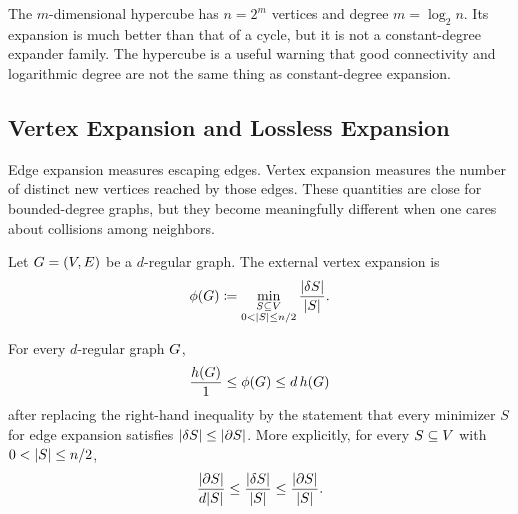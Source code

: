 \begin{example}[Hypercube]
	\label{ex:hypercube}
	The \(m\)-dimensional hypercube has \(n=2^m\) vertices and degree \(m=\log_2 n\). Its expansion is much better than that of a cycle, but it is not a constant-degree expander family. The hypercube is a useful warning that good connectivity and logarithmic degree are not the same thing as constant-degree expansion.
\end{example}

\subsection{Vertex Expansion and Lossless Expansion}
\label{subsec:vertex-expansion}

Edge expansion measures escaping edges. Vertex expansion measures the number of distinct new vertices reached by those edges. These quantities are close for bounded-degree graphs, but they become meaningfully different when one cares about collisions among neighbors.

\begin{definition}
	\label{def:vertex-expansion}
	Let \(G=(V,E)\) be a \(d\)-regular graph. The external vertex expansion is
	\begin{equation}
		\label{eq:vertex-expansion-definition}
		\phi(G)\coloneqq \min_{\substack{S\subseteq V \\ 0<\lvert S\rvert\leq n/2}}\frac{\lvert\delta S\rvert}{\lvert S\rvert}.
	\end{equation}
\end{definition}

\begin{proposition}
	\label{prop:edge-vertex-expansion}
	For every \(d\)-regular graph \(G\),
	\begin{equation}
		\label{eq:edge-vertex-expansion-global}
		\frac{h(G)}{1}\leq \phi(G)\leq d\,h(G)
	\end{equation}
	after replacing the right-hand inequality by the statement that every minimizer \(S\) for edge expansion satisfies \(\lvert\delta S\rvert\leq \lvert\partial S\rvert\). More explicitly, for every \(S\subseteq V\) with \(0<\lvert S\rvert\leq n/2\),
	\begin{equation}
		\label{eq:edge-vertex-expansion-setwise}
		\frac{\lvert\partial S\rvert}{d\lvert S\rvert}\leq \frac{\lvert\delta S\rvert}{\lvert S\rvert}\leq \frac{\lvert\partial S\rvert}{\lvert S\rvert}.
	\end{equation}
\end{proposition}

